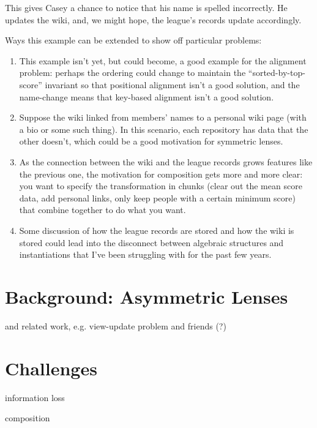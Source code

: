 \documentclass[12pt]{report}
\theoremstyle{definition}
\theoremstyle{remark}
\numberwithin{equation}{section}
\begin{document}
This gives Casey a chance to notice that his name is spelled incorrectly. He
updates the wiki, and, we might hope, the league's records update
accordingly.

Ways this example can be extended to show off particular problems:
\begin{enumerate}
    \item This example isn't yet, but could become, a good example for the
        alignment problem: perhaps the ordering could change to maintain the
        ``sorted-by-top-score'' invariant so that positional alignment isn't
        a good solution, and the name-change means that key-based alignment
        isn't a good solution.

    \item Suppose the wiki linked from members' names to a personal wiki
        page (with a bio or some such thing). In this scenario, each
        repository has data that the other doesn't, which could be a good
        motivation for symmetric lenses.

    \item As the connection between the wiki and the league records grows
        features like the previous one, the motivation for composition gets
        more and more clear: you want to specify the transformation in
        chunks (clear out the mean score data, add personal links, only keep
        people with a certain minimum score) that combine together to do
        what you want.

    \item Some discussion of how the league records are stored and how the
        wiki is stored could lead into the disconnect between algebraic
        structures and instantiations that I've been struggling with for the
        past few years.
\end{enumerate}

\chapter{Background: Asymmetric Lenses}

and related work, e.g. view-update problem and friends (?)

\chapter{Challenges}

information loss

composition
\end{document}
